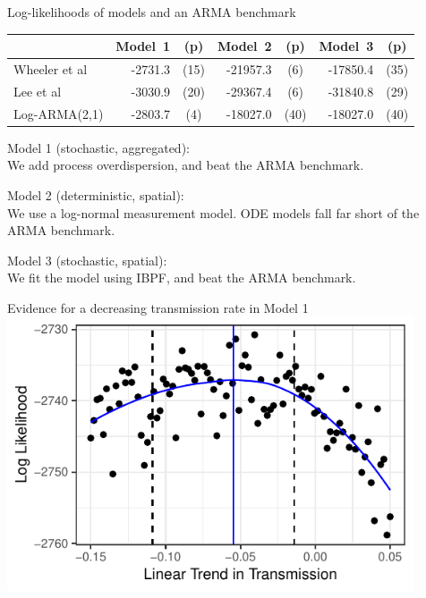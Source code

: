 \documentclass{beamer}
\begin{document}
\begin{frame}{Log-likelihoods of models and an ARMA benchmark}

  \begin{center}
\begin{tabular}{|l|rc|rc|rc|}
\hline
& Model~1& (p) & Model~2 & (p) & Model~3 & (p)
\\
\hline
Wheeler et al
& \cellcolor{yellow!50} -2731.3 & \cellcolor{yellow!50}(15)
& -21957.3 & (6)
& \cellcolor{yellow!50} -17850.4 & \cellcolor{yellow!50}(35)
\\
Lee et al
& -3030.9 & (20)
& -29367.4 & (6)
& -31840.8 & (29)
\\
Log-ARMA(2,1) \hspace{-2.5mm}
& -2803.7 & (4)  %
& \cellcolor{yellow!50} { -18027.0} & \cellcolor{yellow!50} (40)  %
& -18027.0 & (40)
\\
\hline
\end{tabular}
  \end{center}

  \vspace{3mm}
  
  Model 1 (stochastic, aggregated): \\
  We add process overdispersion, and beat the ARMA benchmark.

  \vspace{5mm}

  Model 2 (deterministic, spatial): \\
  We use a log-normal measurement model. ODE models fall far short of the ARMA benchmark.

    \vspace{5mm}

    Model 3 (stochastic, spatial): \\
    We fit the model using IBPF, and beat the ARMA benchmark.
  
\end{frame}

\begin{frame}{Evidence for a decreasing transmission rate in Model 1}
\includegraphics[width=12cm]{haiti/Beta_trend_Figure-1.pdf}
\end{frame}
\end{document}
